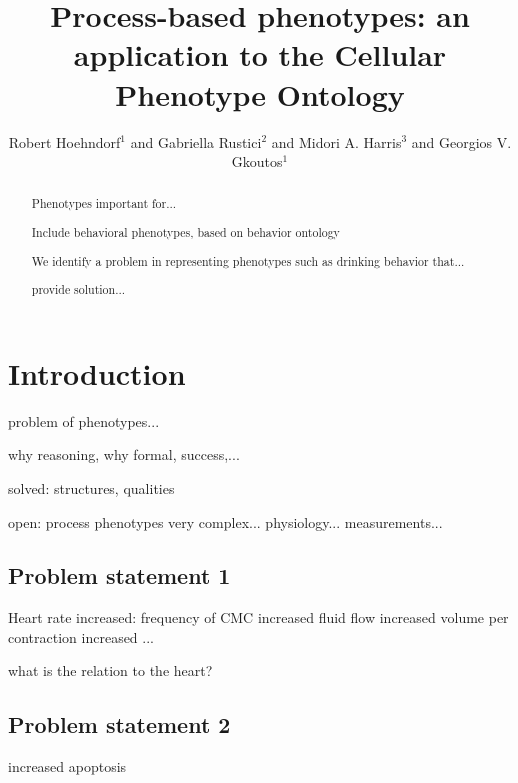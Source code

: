 \documentclass{bioinfo}
\begin{document}

\title{Process-based phenotypes: an application to the Cellular
  Phenotype Ontology}

\author[Hoehndorf et al.]{Robert Hoehndorf$^1$ and Gabriella
  Rustici$^2$ and Midori A. Harris$^3$ and Georgios V. Gkoutos$^{1}$}

\address{$^{1}$Department of Genetics, University of Cambridge,
  Downing Street, Cambridge, Cambridge CB2 3EH, UK\\
  $^{2}$EBI, Wellcome Trust Genome Campus, Hinxton, Cambridge,
  Cambridge CB10 1SD, UK\\
  $^{3}$Department of Biochemistry; University of Cambridge, 80 Tennis Court Road, Cambridge CB2 1GA, UK}

\maketitle
 
\begin{abstract}
  Phenotypes important for...

  Include behavioral phenotypes, based on behavior ontology

  We identify a problem in representing phenotypes such as drinking
  behavior that...

  provide solution...
\end{abstract}

\section{Introduction}

problem of phenotypes...

why reasoning, why formal, success,...

solved: structures, qualities

open: process phenotypes very complex...  
physiology...
measurements...

\subsection{Problem statement 1}
Heart rate increased: frequency of CMC increased fluid flow increased
volume per contraction increased ...

what is the relation to the heart?


\subsection{Problem statement 2}
increased apoptosis
\end{document}
